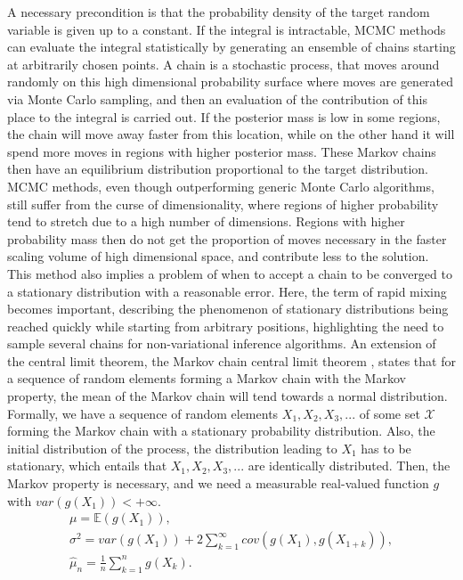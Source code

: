 A necessary precondition is that the probability density of the target random variable is given up to a constant. If the integral is intractable, MCMC methods can evaluate the integral statistically by generating an ensemble of chains starting at arbitrarily chosen points. A chain is a stochastic process, that moves around randomly on this high dimensional probability surface where moves are generated via Monte Carlo sampling, and then an evaluation of the contribution of this place to the integral is carried out. If the posterior mass is low in some regions, the chain will move away faster from this location, while on the other hand it will spend more moves in regions with higher posterior mass. These Markov chains then have an equilibrium distribution proportional to the target distribution. MCMC methods, even though outperforming generic Monte Carlo algorithms, still suffer from the curse of dimensionality, where regions of higher probability tend to stretch due to a high number of dimensions. Regions with higher probability mass then do not get the proportion of moves necessary in the faster scaling volume of high dimensional space, and contribute less to the solution. This method also implies a problem of when to accept a chain to be converged to a stationary distribution with a reasonable error. Here, the term of rapid mixing becomes important, describing the phenomenon of stationary distributions being reached quickly while starting from arbitrary positions, highlighting the need to sample several chains for non-variational inference algorithms. An extension of the central limit theorem, the Markov chain central limit theorem \cite{Andrieu_2003}, states that for a sequence of random elements forming a Markov chain with the Markov property, the mean of the Markov chain will tend towards a normal distribution. Formally, we have a sequence of random elements $X_1, X_2, X_3, ...$ of some set $\mathcal{X}$ forming the Markov chain with a stationary probability distribution. Also, the initial distribution of the process, the distribution leading to $X_1$ has to be stationary, which entails that $X_1, X_2, X_3, ...$ are identically distributed. Then, the Markov property is necessary, and we need a measurable real-valued function $g$ with $var(g(X_1))<+\infty$.
\begin{subequations}%
	\label{eq:markov chain central limit theorem prerequisites}
	\begin{align}
	\mu = \mathbb{E}(g(X_1)),                                                    \label{eq:mean of initial markov chain step} \\
	\sigma^2 = var(g(X_1)) + 2\sum_{k=1}^{\infty}cov(g(X_1), g(X_{1+k})),         \label{eq:variance markov steps} \\
	\hat{\mu}_n = \frac{1}{n} \sum_{k=1}^{n}g(X_k).                               \label{eq:expected mean markov process}
	\end{align}
\end{subequations}

